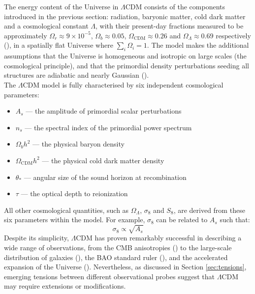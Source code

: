 The energy content of the Universe in $\Lambda$CDM consists of the components introduced in the previous section: radiation, baryonic matter, cold dark matter 
and a cosmological constant $\Lambda$, with their present-day fractions measured to be approximately $\Omega_r \approx 9 \times 10^{-5}$, $\Omega_b \approx 0.05$, 
$\Omega_{\text{CDM}} \approx 0.26$ and $\Omega_\Lambda \approx 0.69$ respectively 
(\cite{Planck_2018_params}), in a spatially flat Universe where $\sum_i \Omega_i = 1$. The model makes the additional assumptions that the 
Universe is homogeneous and isotropic on large scales (the cosmological principle), and that the primordial density perturbations seeding all structures are adiabatic 
and nearly Gaussian (\cite{Planck_2018}). \\

The $\Lambda$CDM model is fully characterised by six independent cosmological 
parameters:

\begin{itemize}
    \item $A_s$ — the amplitude of primordial scalar perturbations
    \item $n_s$ — the spectral index of the primordial power spectrum
    \item $\Omega_b h^2$ — the physical baryon density
    \item $\Omega_{\text{CDM}} h^2$ — the physical cold dark matter density
    \item $\theta_*$ — angular size of the sound horizon at recombination 
    \item $\tau$ — the optical depth to reionization
\end{itemize}

All other cosmological quantities, such as $\Omega_\Lambda$, $\sigma_8$ and $S_8$, are derived from these six parameters within the model. 
For example, $\sigma_8$ can be related to $A_s$ such that:
\begin{equation}
    \sigma_8 \propto \sqrt{A_s}
\end{equation}
Despite its simplicity, $\Lambda$CDM has proven remarkably successful in describing a wide range of observations, from the CMB anisotropies (\cite{Planck_2018_params}) to the 
large-scale distribution of galaxies (\cite{DESI_DR2_2025}), the BAO standard ruler 
(\cite{Eisenstein_2005}), and the accelerated expansion of the Universe (\cite{Riess_1998, Perlmutter_1999}). Nevertheless, as discussed in Section 
\ref{sec:tensions}, emerging tensions between different observational probes suggest that $\Lambda$CDM may require extensions or modifications.\\

